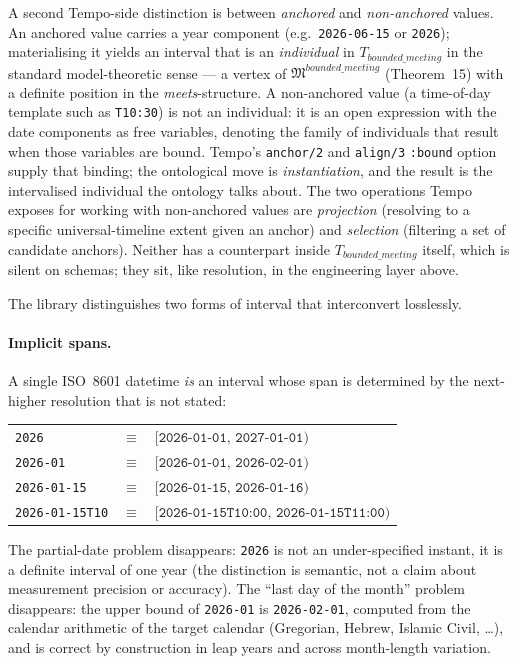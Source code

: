 A second Tempo-side distinction is between \emph{anchored} and
\emph{non-anchored} values. An anchored value carries a year
component (e.g.\ \texttt{2026-06-15} or \texttt{2026}); materialising
it yields an interval that is an \emph{individual} in
$T_{bounded\_meeting}$ in the standard model-theoretic sense ---
a vertex of $\mathfrak{M}^{bounded\_meeting}$ (Theorem~15) with a
definite position in the \textit{meets}-structure. A non-anchored
value (a time-of-day template such as \texttt{T10:30}) is not an
individual: it is an open expression with the date components as
free variables, denoting the family of individuals that result when
those variables are bound. Tempo's \texttt{anchor/2} and
\texttt{align/3} \texttt{:bound} option supply that binding; the
ontological move is \emph{instantiation}, and the result is the
intervalised individual the ontology talks about. The two
operations Tempo exposes for working with non-anchored values are
\emph{projection} (resolving to a specific universal-timeline
extent given an anchor) and \emph{selection} (filtering a set of
candidate anchors). Neither has a counterpart inside
$T_{bounded\_meeting}$ itself, which is silent on schemas; they
sit, like resolution, in the engineering layer above.

The library distinguishes two forms of interval that interconvert
losslessly.

\paragraph*{Implicit spans.} A single ISO~8601 datetime \emph{is} an
interval whose span is determined by the next-higher resolution that
is not stated:
\begin{center}
\begin{tabular}{lcl}
  \texttt{2026}              &$\equiv$& $[\texttt{2026-01-01},\, \texttt{2027-01-01})$ \\
  \texttt{2026-01}           &$\equiv$& $[\texttt{2026-01-01},\, \texttt{2026-02-01})$ \\
  \texttt{2026-01-15}        &$\equiv$& $[\texttt{2026-01-15},\, \texttt{2026-01-16})$ \\
  \texttt{2026-01-15T10}     &$\equiv$& $[\texttt{2026-01-15T10:00},\, \texttt{2026-01-15T11:00})$ \\
\end{tabular}
\end{center}
The partial-date problem disappears: \texttt{2026} is not an
under-specified instant, it is a definite interval of one year (the
distinction is semantic, not a claim about measurement precision or
accuracy). The ``last day of the month'' problem disappears: the
upper bound of \texttt{2026-01} is
\texttt{2026-02-01}, computed from the calendar arithmetic of the
target calendar (Gregorian, Hebrew, Islamic Civil, \dots), and is
correct by construction in leap years and across month-length
variation.

